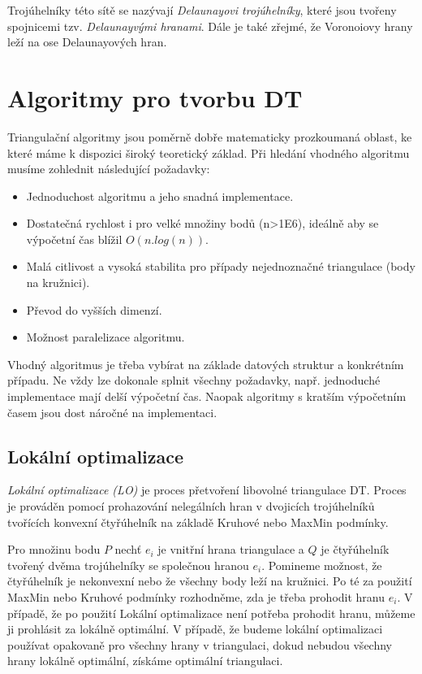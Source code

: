 \documentclass[12pt,a4paper]{article}
\begin{document}
Trojúhelníky této sítě se nazývají \textit{Delaunayovi trojúhelníky}, které jsou tvořeny spojnicemi tzv. \textit{Delaunayvými hranami}. Dále je také zřejmé, že Voronoiovy hrany leží na ose Delaunayových hran.


\newpage
\section{Algoritmy pro tvorbu DT}
Triangulační algoritmy jsou poměrně dobře matematicky prozkoumaná oblast, ke které máme k dispozici široký teoretický základ. Při hledání vhodného algoritmu musíme zohlednit následující požadavky:
\begin{itemize}
\item Jednoduchost algoritmu a jeho snadná implementace.
\item Dostatečná rychlost i pro velké množiny bodů (n>1E6), ideálně aby se výpočetní čas blížil $O(n . log(n))$.
\item Malá citlivost a vysoká stabilita pro případy nejednoznačné triangulace (body na kružnici).
\item Převod do vyšších dimenzí.
\item Možnost paralelizace algoritmu.
\end{itemize}
Vhodný algoritmus je třeba vybírat na základe datových struktur a konkrétním případu. Ne vždy lze dokonale splnit všechny požadavky, např. jednoduché implementace mají delší výpočetní čas. Naopak algoritmy s kratším výpočetním časem jsou dost náročné na implementaci.

\subsection{Lokální optimalizace}
\textit{Lokální optimalizace (LO)} je proces přetvoření libovolné triangulace DT. Proces je prováděn pomocí prohazování nelegálních hran v dvojicích trojúhelníků tvořících konvexní čtyřúhelník na základě Kruhové nebo MaxMin podmínky.

Pro množinu bodu $P$ nechť $e_i$ je vnitřní hrana triangulace a $Q$ je čtyřúhelník tvořený dvěma trojúhelníky se společnou hranou $e_i$. Pomineme možnost, že čtyřúhelník je nekonvexní nebo že všechny body leží na kružnici. Po té za použití MaxMin nebo Kruhové podmínky rozhodněme, zda je třeba prohodit hranu $e_i$. V případě, že po použití Lokální optimalizace není potřeba prohodit hranu, můžeme ji prohlásit za lokálně optimální. V případě, že  budeme lokální optimalizaci používat opakovaně pro všechny hrany v triangulaci, dokud nebudou všechny hrany lokálně optimální, získáme optimální triangulaci.
\end{document}
